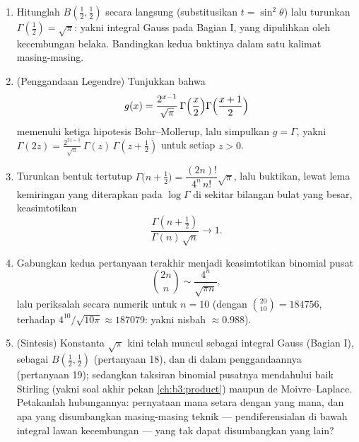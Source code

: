 \begin{problem}
\begin{enumerate}[resume]
\[        f(x) = \frac{B(x, y)\,\Gamma(x + y)}{\Gamma(y)}
        \]
        untuk menyimpulkan \emph{rumus Euler}: $B(x, y) =
        \dfrac{\Gamma(x)\Gamma(y)}{\Gamma(x+y)}$ --- tanpa integral
        rangkap di mana pun.
  \item Hitunglah $B(\frac12, \frac12)$ secara langsung (substitusikan $t
        = \sin^2\theta$) lalu turunkan $\Gamma(\frac12) =
        \sqrt\pi$: yakni integral Gauss pada Bagian I, yang dipulihkan
        oleh kecembungan belaka. Bandingkan kedua buktinya dalam satu
        kalimat masing-masing.
  \item (Penggandaan Legendre) Tunjukkan bahwa
        \[
        g(x) = \frac{2^{x-1}}{\sqrt\pi}\,
        \Gamma\Bigl(\frac x2\Bigr)
        \Gamma\Bigl(\frac{x+1}2\Bigr)
        \]
        memenuhi ketiga hipotesis Bohr--Mollerup, lalu
        simpulkan $g = \Gamma$, yakni $\Gamma(2z) =
        \frac{2^{2z-1}}{\sqrt\pi}\,\Gamma(z)\,\Gamma(z +
        \tfrac12)$ untuk setiap $z > 0$.
  \item Turunkan bentuk tertutup $\Gamma\bigl(n + \tfrac12\bigr)
        = \dfrac{(2n)!}{4^n\,n!}\sqrt\pi$, lalu buktikan, lewat
        lema kemiringan yang diterapkan pada $\log\Gamma$ di sekitar bilangan bulat
        yang besar, keasimtotikan
        \[
        \frac{\Gamma(n + \frac12)}{\Gamma(n)\,\sqrt n}
        \longrightarrow 1 .
        \]
  \item Gabungkan kedua pertanyaan terakhir menjadi keasimtotikan
        binomial pusat
        \[
        \binom{2n}{n} \sim \frac{4^n}{\sqrt{\pi n}},
        \]
        lalu periksalah secara numerik untuk $n = 10$ (dengan $\binom{20}{10} =
        184756$, terhadap $4^{10}/\sqrt{10\pi} \approx
        187079$: yakni nisbah $\approx 0.988$).
  \item (Sintesis) Konstanta $\sqrt\pi$ kini telah muncul sebagai
        integral Gauss (Bagian I), sebagai $B(\frac12,
        \frac12)$ (pertanyaan 18), dan di dalam penggandaannya
        (pertanyaan 19); sedangkan taksiran binomial pusatnya
        mendahului baik Stirling (yakni soal akhir pekan
        \cref{ch:b3:product}) maupun de Moivre--Laplace. Petakanlah
        hubungannya: pernyataan mana setara dengan yang mana,
        dan apa yang disumbangkan masing-masing teknik --- pendiferensialan di bawah
        integral lawan kecembungan --- yang tak dapat disumbangkan yang lain?
\end{enumerate}


\end{problem}
